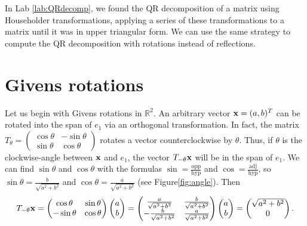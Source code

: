 \label{lab:givens}

In Lab \ref{lab:QRdecomp}, we found the QR decomposition of a matrix using Householder transformations, applying a series of these transformations to a matrix until it was in upper triangular form.
We can use the same strategy to compute the QR decomposition with rotations instead of reflections.

\section*{Givens rotations}

Let us begin with Givens rotations in $\mathbb{R}^2$. 
An arbitrary vector ${\bf x} = (a, b)^T$ can be rotated into the span of $e_1$ via an orthogonal transformation. 
In fact, the matrix $T_{\theta} = \begin{pmatrix}\cos \theta & - \sin \theta \\ \sin \theta & \cos \theta \end{pmatrix}$ rotates a vector counterclockwise by $\theta$.
Thus, if $\theta$ is the clockwise-angle between ${\bf x}$ and $e_1$, the vector $T_{-\theta}{\bf x}$ will be in the span of $e_1$.
We can find $\sin \theta$ and $\cos \theta$ with the formulas $\sin = \frac{\text{opp}}{\text{hyp}}$ and $\cos = \frac{\text{adj}}{\text{hyp}}$, so $\sin \theta = \frac{b}{\sqrt{a^2+b^2}}$ and $\cos \theta =  \frac{a}{\sqrt{a^2+b^2}}$ (see Figure\ref{fig:angle}).
Then 
\[
T_{-\theta}{\bf x} = \begin{pmatrix}\cos \theta &  \sin \theta \\ -\sin \theta & \cos \theta \end{pmatrix} \begin{pmatrix} a \\ b \end{pmatrix} = \begin{pmatrix}\frac{a}{\sqrt{a^2+b^2}} & \frac{b}{\sqrt{a^2+b^2}} \\ -\frac{b}{\sqrt{a^2+b^2}} & \frac{a}{\sqrt{a^2+b^2}} \end{pmatrix}\begin{pmatrix} a \\ b \end{pmatrix} = \begin{pmatrix} \sqrt{a^2+b^2} \\ 0 \end{pmatrix}.
\]

